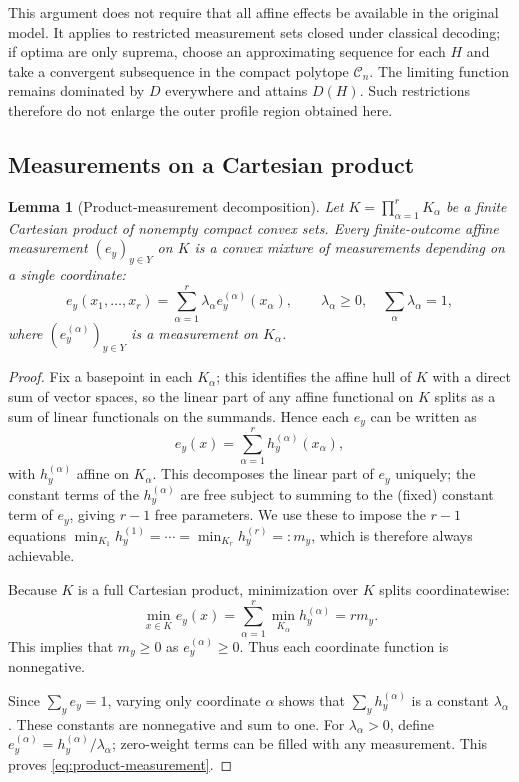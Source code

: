 \documentclass[10pt,a4paper]{amsart}
\newtheorem{lemma}[theorem]{Lemma}
\newcommand{\1}{\mathbf 1}
\newcommand{\Coeff}{\mathcal C}
\begin{document}
This argument does not require that all affine effects be available in the
original model. It applies to restricted measurement sets closed under
classical decoding; if optima are only suprema, choose an approximating sequence
for each $H$ and take a convergent subsequence in the compact polytope
$\Coeff_n$. The limiting function remains dominated by $D$ everywhere and
attains $D(H)$. Such restrictions therefore do not enlarge the outer profile
region obtained here.

\subsection{Measurements on a Cartesian product}

\begin{lemma}[Product-measurement decomposition]\label{lem:product-measurement}
	Let $K=\prod_{\alpha=1}^r K_\alpha$ be a finite Cartesian product of nonempty
	compact convex sets. Every finite-outcome affine measurement $(e_y)_{y\in Y}$
	on $K$ is a convex mixture of measurements depending on a single coordinate:
	\begin{equation}\label{eq:product-measurement}
		e_y(x_1,\ldots,x_r)=\sum_{\alpha=1}^r
		\lambda_\alpha e_y^{(\alpha)}(x_\alpha),
		\qquad \lambda_\alpha\ge0,\quad\sum_\alpha\lambda_\alpha=1,
	\end{equation}
	where $(e_y^{(\alpha)})_{y\in Y}$ is a measurement on $K_\alpha$. 
\end{lemma}

\begin{proof}
	Fix a basepoint in each $K_\alpha$; this identifies the affine hull of $K$
	with a direct sum of vector spaces, so the linear part of any affine
	functional on $K$ splits as a sum of linear functionals on the summands.
	Hence each $e_y$ can be written as
	\[
	e_y(x)=\sum_{\alpha=1}^r h_y^{(\alpha)}(x_\alpha),
	\]
	with $h_y^{(\alpha)}$ affine on $K_\alpha$. This decomposes the linear part
	of $e_y$ uniquely; the constant terms of the $h_y^{(\alpha)}$ are free
	subject to summing to the (fixed) constant term of $e_y$, giving $r-1$
	free parameters. We use these to impose the $r-1$ equations
	$\min_{K_1}h_y^{(1)}=\cdots=\min_{K_r}h_y^{(r)}=:m_y$, which is therefore
	always achievable.
	
	Because $K$ is a full Cartesian product, minimization over $K$ splits coordinatewise:
	\[
	\min_{x\in K}e_y(x)=\sum_{\alpha=1}^r\min_{K_\alpha}h_y^{(\alpha)}=rm_y.
	\]
	This implies that $m_y\ge0$ as $e_y^{(\alpha)}\geq 0$.
	Thus each coordinate function is
	nonnegative.
	
	Since $\sum_ye_y=1$, varying only coordinate $\alpha$ shows that
	$\sum_yh_y^{(\alpha)}$ is a constant $\lambda_\alpha$. These constants are
	nonnegative and sum to one. For $\lambda_\alpha>0$, define
	$e_y^{(\alpha)}=h_y^{(\alpha)}/\lambda_\alpha$; zero-weight terms can be filled with any measurement. This proves \eqref{eq:product-measurement}.
	
\end{proof}
\end{document}
